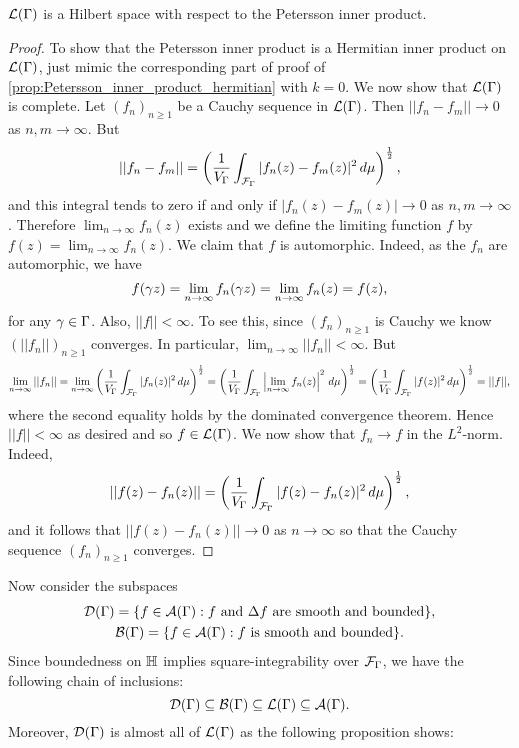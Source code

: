       \begin{theorem}
        $\mathcal{L}(\Gamma)$ is a Hilbert space with respect to the Petersson inner product.
      \end{theorem}
      \begin{proof}
        To show that the Petersson inner product is a Hermitian inner product on $\mathcal{L}(\Gamma)$, just mimic the corresponding part of proof of \cref{prop:Petersson_inner_product_hermitian} with $k = 0$. We now show that $\mathcal{L}(\Gamma)$ is complete. Let $(f_{n})_{n \ge 1}$ be a Cauchy sequence in $\mathcal{L}(\Gamma)$. Then $||f_{n}-f_{m}|| \to 0$ as $n,m \to \infty$. But
        \[
          ||f_{n}-f_{m}|| = \left(\frac{1}{V_{\Gamma}}\int_{\mathcal{F}_{\Gamma}}|f_{n}(z)-f_{m}(z)|^{2}\,d\mu\right)^{\frac{1}{2}},
        \]
        and this integral tends to zero if and only if $|f_{n}(z)-f_{m}(z)| \to 0$ as $n,m \to \infty$. Therefore $\lim_{n \to \infty}f_{n}(z)$ exists and we define the limiting function $f$ by $f(z) = \lim_{n \to \infty}f_{n}(z)$. We claim that $f$ is automorphic. Indeed, as the $f_{n}$ are automorphic, we have
        \[
          f(\gamma z) = \lim_{n \to \infty}f_{n}(\gamma z) = \lim_{n \to \infty}f_{n}(z) = f(z),
        \]
        for any $\gamma \in \Gamma$. Also, $||f|| < \infty$. To see this, since $(f_{n})_{n \ge 1}$ is Cauchy we know $(||f_{n}||)_{n \ge 1}$ converges. In particular, $\lim_{n \to \infty}||f_{n}|| < \infty$. But
        \[
          \lim_{n \to \infty}||f_{n}|| = \lim_{n \to \infty}\left(\frac{1}{V_{\Gamma}}\int_{\mathcal{F}_{\Gamma}}|f_{n}(z)|^{2}\,d\mu\right)^{\frac{1}{2}} = \left(\frac{1}{V_{\Gamma}}\int_{\mathcal{F}_{\Gamma}}\left|\lim_{n \to \infty}f_{n}(z)\right|^{2}\,d\mu\right)^{\frac{1}{2}} = \left(\frac{1}{V_{\Gamma}}\int_{\mathcal{F}_{\Gamma}}|f(z)|^{2}\,d\mu\right)^{\frac{1}{2}} = ||f||,
        \]
        where the second equality holds by the dominated convergence theorem. Hence $||f|| < \infty$ as desired and so $f \in \mathcal{L}(\Gamma)$. We now show that $f_{n} \to f$ in the $L^{2}$-norm. Indeed,
        \[
          ||f(z)-f_{n}(z)|| = \left(\frac{1}{V_{\Gamma}}\int_{\mathcal{F}_{\Gamma}}|f(z)-f_{n}(z)|^{2}\,d\mu\right)^{\frac{1}{2}},
        \]
        and it follows that $||f(z)-f_{n}(z)|| \to 0$ as $n \to \infty$ so that the Cauchy sequence $(f_{n})_{n \ge 1}$ converges.
      \end{proof}

      Now consider the subspaces
      \begin{gather*}
        \mathcal{D}(\Gamma) = \{f \in \mathcal{A}(\Gamma):\text{$f$ and $\Delta f$ are smooth and bounded}\}, \\
        \mathcal{B}(\Gamma) = \{f \in \mathcal{A}(\Gamma):\text{$f$ is smooth and bounded}\}.
      \end{gather*}
      Since boundedness on $\mathbb{H}$ implies square-integrability over $\mathcal{F}_{\Gamma}$, we have the following chain of inclusions:
      \[
        \mathcal{D}(\Gamma) \subseteq \mathcal{B}(\Gamma) \subseteq \mathcal{L}(\Gamma) \subseteq \mathcal{A}(\Gamma).
      \]
      Moreover, $\mathcal{D}(\Gamma)$ is almost all of $\mathcal{L}(\Gamma)$ as the following proposition shows:

